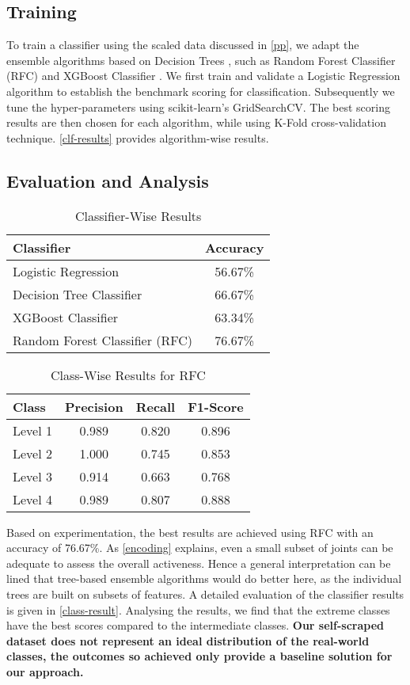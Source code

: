 \documentclass[sigconf]{acmart}
\begin{document}
\subsection{Training}\label{ml}
To train a classifier using the scaled data discussed in \autoref{pp}, we adapt the ensemble algorithms based on Decision Trees \cite{10.1023/A:1016409317640}, such as Random Forest Classifier (RFC) \cite{10.1023/A:1010933404324} and XGBoost Classifier \cite{Chen:2016:XST:2939672.2939785}. We first train and validate a Logistic Regression algorithm \cite{ref1} to establish the benchmark scoring for classification. Subsequently we tune the hyper-parameters using scikit-learn's GridSearchCV. The best scoring results are then chosen for each algorithm, while using K-Fold cross-validation technique. \autoref{clf-results} provides algorithm-wise results. 
\subsection{Evaluation and Analysis}\label{eval}

\begin{table}[h]
\caption{Classifier-Wise Results}\label{clf-results}
  \begin{tabular}{|l|c|}
    \toprule
    \textbf{Classifier}&\textbf{Accuracy}\\
    \midrule
    Logistic Regression&56.67\%\\
    Decision Tree Classifier&66.67\%\\
    XGBoost Classifier&63.34\%\\
    Random Forest Classifier (RFC)&76.67\%\\
  \bottomrule
\end{tabular}
\end{table}
\begin{table}[h]
\caption{Class-Wise Results for RFC}\label{class-result}
  \begin{tabular}{|l|c|c|c|}
    \toprule
    \textbf{Class}&\textbf{Precision}&\textbf{Recall}&\textbf{F1-Score}\\
    \midrule
    {Level 1}&0.989&0.820&0.896\\
    {Level 2}&1.000&0.745&0.853\\
    {Level 3}&0.914&0.663&0.768\\
    {Level 4}&0.989&0.807&0.888\\
    \bottomrule
\end{tabular}
\end{table}

Based on experimentation, the best results are achieved using RFC with an accuracy of 76.67\%. As \autoref{encoding} explains, even a small subset of joints can be adequate to assess the overall activeness. Hence a general interpretation can be lined that tree-based ensemble algorithms would do better here, as the individual trees are built on subsets of features.  A detailed evaluation of the classifier results is given in \autoref{class-result}. Analysing the results, we find that the extreme classes have the best scores compared to the intermediate classes.  \textbf{Our self-scraped dataset does not represent an ideal distribution of the real-world classes, the outcomes so achieved only provide a baseline solution for our approach.}
\end{document}
